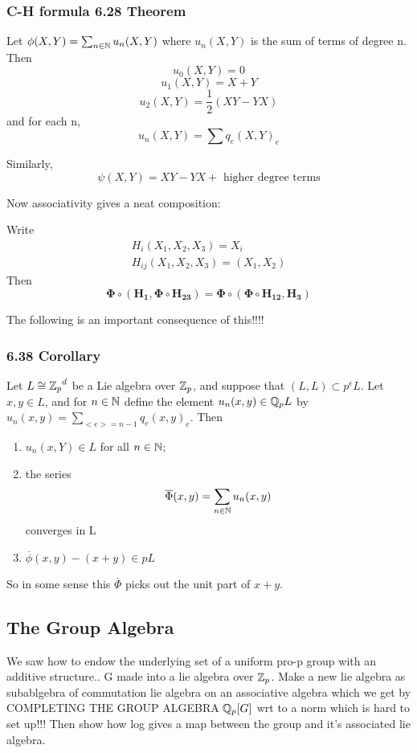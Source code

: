 \subsubsection*{C-H formula 6.28 Theorem}
Let $\phi(X,Y) = \sum_{n\in \mathbb N} u_n (X,Y)$ where $u_n (X,Y)$ is the sum of terms of degree n. Then
$$u_0(X,Y) = 0$$
$$u_1(X,Y) = X+Y$$
$$u_2(X,Y) = \frac 1 2 (XY-YX)$$
and for each n,
$$u_n(X,Y) = \sum q_e (X,Y)_e$$

Similarly,
$$\psi(X,Y) = XY-YX + \text{ higher degree terms}$$

Now associativity gives a neat composition:

Write
\begin{eqnarray}
\nonumber H_i(X_1 , X_2 , X_3) = X_i\\
\nonumber H_{ij}(X_1, X_2, X_3) = (X_1, X_2)
\end{eqnarray}
Then
$$\mathbf{\Phi\circ (H_1, \Phi\circ H_{23}) = \Phi\circ(\Phi \circ H_{12}, H_3)}$$


The following is an important consequence of this!!!!

\subsubsection{6.38 Corollary}
Let $L\cong {\mathbb Z_p}^d$ be a Lie algebra over $\mathbb Z_p$, and suppose that $(L,L)\subset p^\epsilon L$. Let $x,y\in L$, and for $n\in\mathbb N$ define the element $u_n(x,y)\in\mathbb Q_p L$ by $u_n(x,y) = \sum_{<e>=n-1}q_e (x,y)_e$. Then
\begin{enumerate}
\item $u_n(x,Y)\in L$ for all $n\in \mathbb N$;
\item the series 
$$\overline{\Phi}(x,y) = \sum_{n\in \mathbb N} u_n (x,y)$$ converges in L
\item $\overline \phi (x,y) - (x+y) \in pL$

\end{enumerate}
So in some sense this $\overline \Phi$ picks out the unit part of $x+y$.


\subsection{The Group Algebra}
We saw how to endow the underlying set of a uniform pro-p group with an additive structure.. G made into a lie algebra over $\mathbb Z_p$. Make a new lie algebra as subablgebra of commutation lie algebra on an associative algebra which we get by  COMPLETING THE GROUP ALGEBRA $\mathbb Q_p [G]$ wrt to a norm which is hard to set up!!!  Then show how log gives a map between the group and it's associated lie algebra.

